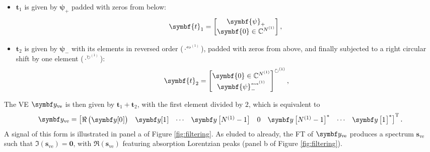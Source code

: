 \begin{itemize}
    \item $\symbf{t}_1$ is given by $\symbf{\psi}_+$ padded with zeros from below:
        \begin{equation}
            \symbf{t}_1 = \begin{bmatrix}
                \symbf{\psi}_+ \\ \symbf{0} \in \mathbb{C}^{\None}
            \end{bmatrix},\\
        \end{equation}
    \item $\symbf{t}_2$ is given by $\symbf{\psi}_{-}$ with its elements in
        reversed order ($\cdot^{{\leftrightsquigarrow}^{(1)}}$), padded with zeros
        from above, and finally subjected to a right circular shift by one
        element ($\cdot^{{\circlearrowright}^{(1)}}$):
        \begin{equation}
            \symbf{t}_2 = \begin{bmatrix}
                \symbf{0} \in \mathbb{C}^{\None} \\ \symbf{\psi}_-^{{\leftrightsquigarrow}^{(1)}}
        \end{bmatrix}^{{\circlearrowright}^{(1)}},
       \end{equation}
\end{itemize}
The \ac{VE} $\by_{\text{ve}}$ is then given by $\symbf{t}_1 +
\symbf{t}_2$, with the first element divided by $2$, which is equivalent to
\begin{equation}
    \by_{\text{ve}} =
    \begin{bmatrix}
        \Re\left( \by[0^{\vphantom{(1)}}] \right) &
        \by[1^{\vphantom{(1)}}] &
        \cdots &
        \by\left[\None - 1\right] &
        0 &
        \by\left[\None - 1\right]^* &
        \cdots &
        \by\left[1^{\vphantom{(1)}}\right]^*
    \end{bmatrix}\T.
\end{equation}
A signal of this form is illustrated in panel a of Figure \ref{fig:filtering}. As
eluded to already, the \ac{FT} of $\by_{\text{ve}}$ produces a spectrum
$\symbf{s}_{\text{ve}}$ such that $\Im\left(\symbf{s}_{\text{ve}}\right) =
\symbf{0}$, with $\Re\left(\symbf{s}_{\text{ve}}\right)$ featuring absorption
Lorentzian peaks (panel b of Figure \ref{fig:filtering}).

